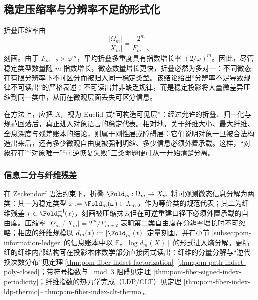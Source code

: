 \subsection{稳定压缩率与分辨率不足的形式化}\label{subsec:folding-stable-compression-resolution}

折叠压缩率由
\[
\frac{|\Omega_m|}{|X_m|}=\frac{2^m}{F_{m+2}}
\]
刻画。由于 $F_{m+2}\asymp \varphi^m$，平均折叠多重度具有指数增长率 $(2/\varphi)^m$。因此，尽管稳定类型数量随 $m$ 指数增长，微态数量增长更快，折叠必然为多对一：不同微态在有限分辨率下不可区分而被归入同一稳定类型。该结论给出“分辨率不足导致规律不可读出”的严格表述：不可读出并非缺乏规律，而是稳定投影将大量微差异压缩到同一类中，从而在微观层面丢失可区分信息。

\begin{remark}[构造层与刚性层的区分]\label{rem:fold-constructibility-rigidity-split}
在方法上，应把 \(X_m\) 视为 Euclid 式“可构造可见层”：经过允许的折叠、归一化与规范回落后，真正进入对象语言的稳定代表。相对地，关于纤维大小、最大纤维、全息深度与残差账本的结论，则属于刚性层或障碍层：它们说明对象一旦被合法构造出来后，还有多少微观自由度被强制坍缩、多少信息必须外置承载。这样，“对象存在”“对象唯一”“可逆恢复失败”三类命题便可从一开始清楚分离。
\end{remark}

\subsubsection{信息二分与纤维残差}
在 Zeckendorf 语法约束下，折叠 $\Fold_m:\Omega_m\to X_m$ 将可观测微态信息分解为两类：其一为稳定类型 $x:=\Fold_m(\omega)\in X_m$，作为等价类的规范代表；其二为纤维残差 $r\in \Fold_m^{-1}(x)$，刻画被压缩抹去但在可逆重建口径下必须外置承载的自由度。压缩率 $|\Omega_m|/|X_m|=2^m/F_{m+2}$ 表明第二类自由度在分辨率增长时不可忽略；相应的纤维规模以 $d_m(x):=|\Fold_m^{-1}(x)|$ 定量刻画，并在小节 \ref{subsec:pom-information-ledger} 的信息账本中以 $\mathbb{E}_{\pi}[\log d_m(X)]$ 的形式进入熵分解。更精细的纤维内部结构可在投影本体数学部分直接闭式读出：纤维的分量分解与“逆代换次数分布”见定理 \ref{thm:pom-fiber-indset-factorization}--\ref{thm:pom-path-indset-poly-closed}；带符号指数与 \(\bmod 3\) 阻碍见定理 \ref{thm:pom-fiber-signed-index-periodicity}；纤维指数的热力学完成（LDP/CLT）见定理 \ref{thm:pom-fiber-index-ldp-thermo}--\ref{thm:pom-fiber-index-clt-thermo}。

